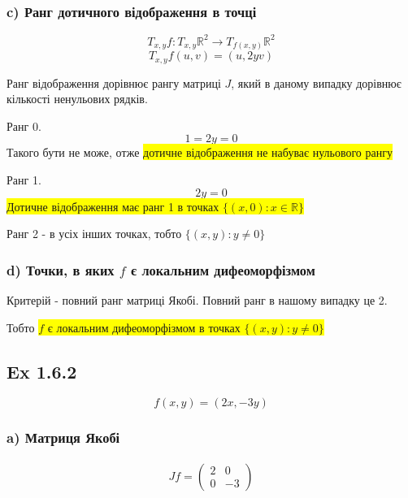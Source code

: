 \documentclass[10pt, a4paper]{article} %
\newcommand{\R}{\mathbb{R}}
\newcommand{\todo}[1]{\colorbox{red}{\textbf{TODO}: #1}}
\begin{document}
\subsubsection*{c) Ранг дотичного відображення в точці}
\[T_{x,y}f : T_{x,y}\R^2 \to T_{f(x,y)}\R^2\]
\[T_{x,y}f(u,v) = (u, 2yv)\]

Ранг відображення дорівнює рангу матриці $J$, який в даному випадку дорівнює кількості ненульових рядків.

Ранг 0.
\[1=2y=0\]
Такого бути не може, отже \colorbox{yellow}{дотичне відображення не набуває нульового рангу}

Ранг 1.
\[2y=0\]
\colorbox{yellow}{Дотичне відображення має ранг 1 в точках $\{(x,0) : x\in\R\}$}

Ранг 2 - в усіх інших точках, тобто $\{(x,y) : y\ne 0\}$

\subsubsection*{d) Точки, в яких $f$ є локальним дифеоморфізмом}
Критерій - повний ранг матриці Якобі.
Повний ранг в нашому випадку це 2.

Тобто \colorbox{yellow}{$f$ є локальним дифеоморфізмом в точках $\{(x,y) : y\ne 0\}$}


\subsection*{Ex 1.6.2}
\[f(x,y) = (2x,-3y)\]
\subsubsection*{a) Матриця Якобі}
\begin{align*}
    Jf = \begin{pmatrix}
        2 & 0\\
        0 & -3
    \end{pmatrix}
\end{align*}
\end{document}

